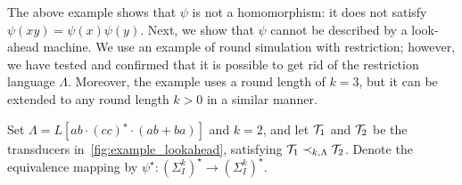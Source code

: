 The above example shows that $\psi$ is not a homomorphism: it does not satisfy $\psi(xy)=\psi(x)\psi(y)$. Next, we show that $\psi$ cannot be described by a look-ahead machine. We use an example of round simulation with restriction; however, we have tested and confirmed that it is possible to get rid of the restriction language $\Lambda$. Moreover, the example uses a round length of $k=3$, but it can be extended to any round length $k>0$ in a similar manner.

\begin{example}
\label{example:lookahead}
Set $\Lambda=L[ab\cdot (cc)^\star\cdot (ab+ba)]$ and $k=2$, and let $\mathcal{T}_1$ and $\mathcal{T}_2$ be the transducers in~\autoref{fig:example_lookahead}, satisfying $\mathcal{T}_1\prec_{k,\Lambda} \mathcal{T}_2$. Denote the equivalence mapping by $\psi^\star: (\Sigma_I^k)^\star \rightarrow (\Sigma_I^k)^\star$.


\end{example}
